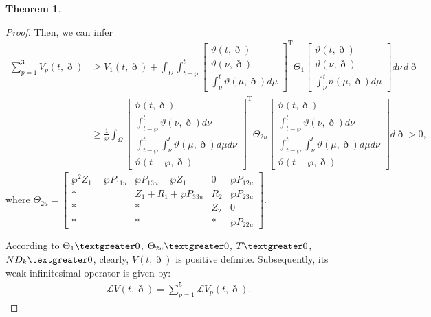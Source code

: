 \documentclass[preprint,review,fleqn,sort&compress,3p]{elsarticle}
\theoremstyle{definition}%
\newtheorem{thm}{Theorem}[section]
\begin{document}
\begin{thm}
\begin{proof}
		Then, we can infer
		\begin{align}
			\sum_{p=1}^3 V_p(t, \eth) 
			&\geq V_1(t, \eth) + \int_\Omega \int_{t-\wp}^t \left[ \begin{array}{c} \vartheta(t, \eth) \\ \vartheta(\nu, \eth)\\\int_\nu^t \vartheta(\mu, \eth) d\mu \end{array} \right]^\text{T} \Theta_1 \left[ \begin{array}{c} \vartheta(t, \eth) \\ \vartheta(\nu, \eth)\\\int_\nu^t \vartheta(\mu, \eth) d\mu \end{array} \right] d\nu \, d\eth\nonumber\\
			&\geq \frac{1}{\wp} \int_\Omega \left[ \begin{array}{c} \vartheta(t, \eth) \\ \int_{t-\wp}^t \vartheta(\nu, \eth) d\nu\\\int_{t-\wp}^t \int_\nu^t \vartheta(\mu, \eth) d\mu d\nu \\ \vartheta(t-\wp,\eth)\end{array} \right]^\text{T} \Theta_{2u} \left[ \begin{array}{c} \vartheta(t, \eth) \\ \int_{t-\wp}^t \vartheta(\nu, \eth) d\nu\\\int_{t-\wp}^t \int_\nu^t \vartheta(\mu, \eth) d\mu d\nu \\ \vartheta(t-\wp,\eth)\end{array} \right] d\eth > 0,
		\end{align}
		where $\Theta_{2u} = \begin{bmatrix}
			\wp^2 Z_1 + \wp P_{11u} & \wp P_{13u} - \wp Z_1 & 0 & \wp P_{12u} \\
			* & Z_1 + R_1 + \wp P_{33u} & R_2 & \wp P_{23u} \\
			* & * & Z_2 & 0 \\
			* & * & * & \wp P_{22u}
		\end{bmatrix}$.
		
		According to $\Theta_{1}\textgreater 0$, $\Theta_{2u} \textgreater 0 $, $ T \textgreater 0 $, $ N D_k \textgreater 0 $, clearly, $ V(t, \eth)$ is positive definite. Subsequently, its weak infinitesimal operator is given by:
		\begin{align}\label{DLKF}
			\mathcal{L}V(t,\eth)=\sum_{p=1}^{5}\mathcal{L}V_{p}(t,\eth).
		\end{align}
		

\end{proof}
\end{thm}
\end{document}
